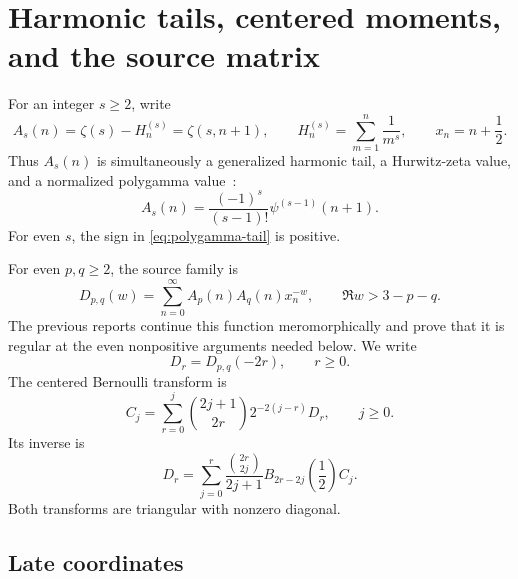 \section{Harmonic tails, centered moments, and the source matrix}
\label{sec:framework}

For an integer $s\ge2$, write
\begin{equation}
 A_s(n)=\zeta(s)-H_n^{(s)}=\zeta(s,n+1),
 \qquad
 H_n^{(s)}=\sum_{m=1}^n\frac1{m^s},
 \qquad x_n=n+\frac12.
 \label{eq:tail}
\end{equation}
Thus $A_s(n)$ is simultaneously a generalized harmonic tail, a
Hurwitz-zeta value, and a normalized polygamma value~\cite{DLMF}:
\begin{equation}
 A_s(n)=\frac{(-1)^s}{(s-1)!}\psi^{(s-1)}(n+1).
 \label{eq:polygamma-tail}
\end{equation}
For even $s$, the sign in \eqref{eq:polygamma-tail} is positive.

For even $p,q\ge2$, the source family is
\begin{equation}
 D_{p,q}(w)=\sum_{n=0}^{\infty}A_p(n)A_q(n)x_n^{-w},
 \qquad \Re w>3-p-q.
 \label{eq:dirichlet-family}
\end{equation}
The previous reports continue this function meromorphically and prove
that it is regular at the even nonpositive arguments needed below.  We
write
\[
 D_r=D_{p,q}(-2r),\qquad r\ge0.
\]
The centered Bernoulli transform is
\begin{equation}
 C_j=\sum_{r=0}^j
       \binom{2j+1}{2r}2^{-2(j-r)}D_r,
 \qquad j\ge0.
 \label{eq:C-transform}
\end{equation}
Its inverse is
\begin{equation}
 D_r=\sum_{j=0}^r\frac{\binom{2r}{2j}}{2j+1}
 B_{2r-2j}\!\left(\frac12\right)C_j.
 \label{eq:C-inverse}
\end{equation}
Both transforms are triangular with nonzero diagonal.

\subsection{Late coordinates}

